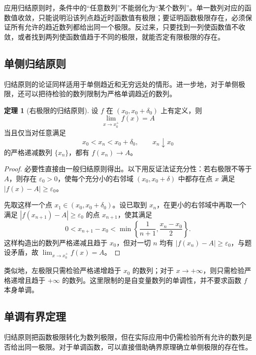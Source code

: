\documentclass[UTF8,fontset=fandol,a4paper,12pt]{ctexart}
\theoremstyle{definition}
\newtheorem{theorem}{定理}
\begin{document}
应用归结原则时，条件中的“任意数列”不能弱化为“某个数列”。单一数列对应的函数值收敛，只能说明沿该列点趋近时函数值有极限；要证明函数极限存在，必须保证所有允许的趋近数列都给出同一个极限。反过来，只要找到一列使函数值不收敛，或者找到两列使函数值趋于不同的极限，就能否定有限极限的存在。

\subsection*{单侧归结原则}
归结原则的论证同样适用于单侧趋近和无穷远处的情形。进一步地，对于单侧极限，还可以把待检验的数列限制为严格单调趋近的数列。

\begin{theorem}[右极限的归结原则]
设 $f$ 在 $(x_0,x_0+\delta_0)$ 上有定义，则
\[
 \lim_{x\to x_0^+}f(x)=A
\]
当且仅当对任意满足
\[
 x_0<x_n<x_0+\delta_0,\qquad x_n\downarrow x_0
\]
的严格递减数列 $\{x_n\}$，都有 $f(x_n)\to A$。
\end{theorem}
\begin{proof}
必要性直接由一般归结原则得出。以下用反证法证充分性：若右极限不等于 $A$，则存在 $\varepsilon_0>0$，使每个充分小的右邻域 $(x_0,x_0+\delta)$ 中都存在点 $x$ 满足 $|f(x)-A|\ge\varepsilon_0$。

先取这样一个点 $x_1\in(x_0,x_0+\delta_0)$。设已取到 $x_n$，在更小的右邻域中再取一个满足 $|f(x_{n+1})-A|\ge\varepsilon_0$ 的点 $x_{n+1}$，使其满足
\[
 0<x_{n+1}-x_0<\min\left\{\frac1{n+1},\frac{x_n-x_0}{2}\right\}.
\]
这样构造出的数列严格递减且趋于 $x_0$，但对一切 $n$ 均有 $|f(x_n)-A|\ge\varepsilon_0$，与题设矛盾，故 $\lim_{x\to x_0^+}f(x)=A$。
\end{proof}

类似地，左极限只需检验严格递增趋于 $x_0$ 的数列；对于 $x\to+\infty$，则只需检验严格递增且趋于 $+\infty$ 的数列。这里限制的是自变量数列的单调性，并不要求函数 $f$ 本身单调。

\subsection*{单调有界定理}
归结原则把函数极限转化为数列极限，但在实际应用中仍需检验所有允许的数列是否给出同一极限。对于单调函数，可以直接借助确界原理确立单侧极限的存在性。
\end{document}

